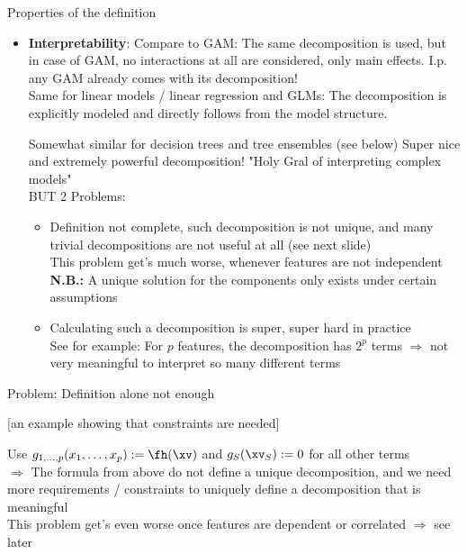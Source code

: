 \documentclass[11pt,compress,t,notes=noshow, aspectratio=169, xcolor=table]{beamer}
\begin{document}
\begin{frame}{Properties of the definition}
\begin{itemize}
    \item \textbf{Interpretability}:
    Compare to GAM: The same decomposition is used, but in case of GAM, no interactions at all are considered, only main effects. I.p. any GAM already comes with its decomposition! \\
    Same for linear models / linear regression and GLMs: The decomposition is explicitly modeled and directly follows from the model structure.

    Somewhat similar for decision trees and tree ensembles (see below)
    Super nice and extremely powerful decomposition! "Holy Gral of interpreting complex models"\\
    BUT 2 Problems:
    \begin{itemize}
        \item Definition not complete, such decomposition is not unique, and many trivial decompositions are not useful at all (see next slide) \\
            This problem get's much worse, whenever features are not independent \\
        \textbf{N.B.:} %
        A unique solution for the components only exists under certain assumptions
        \item Calculating such a decomposition is super, super hard in practice \\
            See for example: For \(p\) features, the decomposition has \(2^p\) terms \(\Rightarrow\) not very meaningful to interpret so many different terms \\
    \end{itemize}
\end{itemize}
\end{frame}

\begin{frame}{Problem: Definition alone not enough}

    [an example showing that constraints are needed]

    Use $g_{1, \dots, p}(x_1, \dots, x_p) := \fh(\xv)$ and $g_S(\xv_S) := 0$ for all other terms
    \\
    \(\Rightarrow\) The formula from above do not define a unique decomposition, and we need more requirements / constraints to uniquely define a decomposition that is meaningful
    \\
    This problem get's even worse once features are dependent or correlated \(\Rightarrow\) see later
    
\end{frame}
\end{document}
